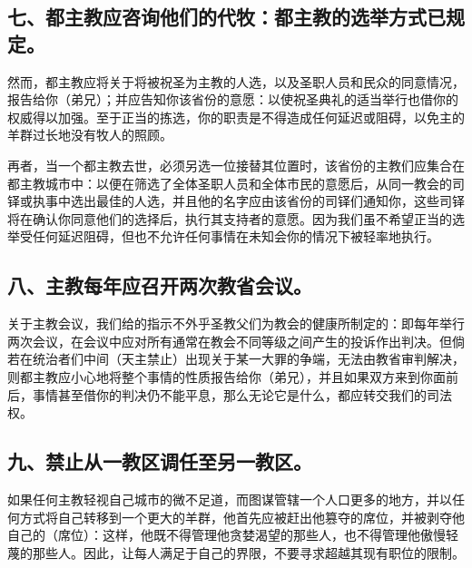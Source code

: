 \subsection{七、都主教应咨询他们的代牧：都主教的选举方式已规定。}

然而，都主教应将关于将被祝圣为主教的人选，以及圣职人员和民众的同意情况，报告给你（弟兄）；并应告知你该省份的意愿：以使祝圣典礼的适当举行也借你的权威得以加强。至于正当的拣选，你的职责是不得造成任何延迟或阻碍，以免主的羊群过长地没有牧人的照顾。\par

再者，当一个都主教去世，必须另选一位接替其位置时，该省份的主教们应集合在都主教城市中：以便在筛选了全体圣职人员和全体市民的意愿后，从同一教会的司铎或执事中选出最佳的人选，并且他的名字应由该省份的司铎们通知你，这些司铎将在确认你同意他们的选择后，执行其支持者的意愿。因为我们虽不希望正当的选举受任何延迟阻碍，但也不允许任何事情在未知会你的情况下被轻率地执行。\par


\subsection{八、主教每年应召开两次教省会议。}

关于主教会议，我们给的指示不外乎圣教父们为教会的健康所制定的：即每年举行两次会议，在会议中应对所有通常在教会不同等级之间产生的投诉作出判决。但倘若在统治者们中间（天主禁止）出现关于某一大罪的争端，无法由教省审判解决，则都主教应小心地将整个事情的性质报告给你（弟兄），并且如果双方来到你面前后，事情甚至借你的判决仍不能平息，那么无论它是什么，都应转交我们的司法权。\par


\subsection{九、禁止从一教区调任至另一教区。}

如果任何主教轻视自己城市的微不足道，而图谋管辖一个人口更多的地方，并以任何方式将自己转移到一个更大的羊群，他首先应被赶出他篡夺的席位，并被剥夺他自己的（席位）：这样，他既不得管理他贪婪渴望的那些人，也不得管理他傲慢轻蔑的那些人。因此，让每人满足于自己的界限，不要寻求超越其现有职位的限制。\par

